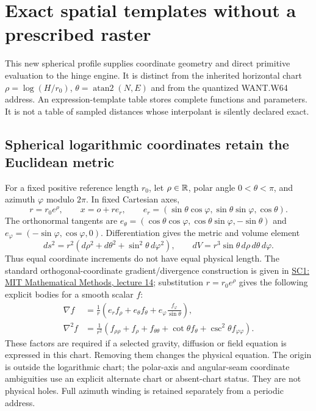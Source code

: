 \section{Exact spatial templates without a prescribed raster}
\label{sec:r15-spatial-calculus}
This new spherical profile supplies coordinate geometry and direct primitive
evaluation to the hinge engine. It is distinct from the inherited horizontal
chart $\rho=\log(H/r_0)$, $\theta=\operatorname{atan2}(N,E)$ and from the
quantized WANT.W64 address. An expression-template table stores complete
functions and parameters. It is not a table of sampled distances whose
interpolant is silently declared exact.

\subsection{Spherical logarithmic coordinates retain the Euclidean metric}
For a fixed positive reference length $r_0$, let $\rho\in\mathbb R$, polar angle
$0<\theta<\pi$, and azimuth $\varphi$ modulo $2\pi$. In fixed Cartesian axes,
\begin{equation}
 r=r_0e^\rho,\qquad
 x=o+r e_r,\qquad
 e_r=(\sin\theta\cos\varphi,\sin\theta\sin\varphi,\cos\theta).
 \label{eq:r15-log-spherical}
\end{equation}
The orthonormal tangents are
$e_\theta=(\cos\theta\cos\varphi,\cos\theta\sin\varphi,-\sin\theta)$
and $e_\varphi=(-\sin\varphi,\cos\varphi,0)$. Differentiation gives the
metric and volume element
\begin{equation}
 ds^2=r^2(d\rho^2+d\theta^2+\sin^2\theta\,d\varphi^2),
 \qquad dV=r^3\sin\theta\,d\rho\,d\theta\,d\varphi.
 \label{eq:r15-spherical-metric}
\end{equation}
Thus equal coordinate increments do not have equal physical length. The
standard orthogonal-coordinate gradient/divergence construction is given in
\href{https://web.mit.edu/8.Math/www/lectures/lec14/lec14.pdf}
{SC1: MIT Mathematical Methods, lecture 14}; substitution $r=r_0e^\rho$
gives the following explicit bodies for a smooth scalar $f$:
\begin{align}
 \nabla f&=\frac1r\left(e_r f_\rho+e_\theta f_\theta
                  +e_\varphi\frac{f_\varphi}{\sin\theta}\right),\nonumber\\
 \nabla^2f&=\frac1{r^2}\left(f_{\rho\rho}+f_\rho+
             f_{\theta\theta}+\cot\theta f_\theta+
             \csc^2\theta f_{\varphi\varphi}\right).
 \label{eq:r15-spherical-differential}
\end{align}
These factors are required if a selected gravity, diffusion or field equation
is expressed in this chart. Removing them changes the physical equation.
The origin is outside the logarithmic chart; the polar-axis and angular-seam
coordinate ambiguities use an explicit alternate chart or absent-chart status.
They are not physical holes. Full azimuth winding is retained separately from
a periodic address.

